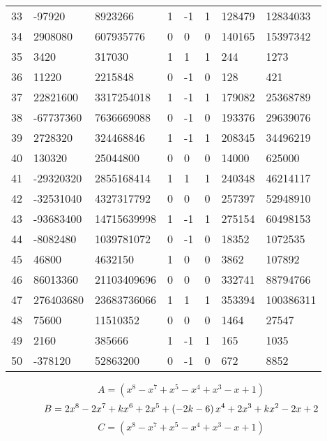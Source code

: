 \documentclass{amsart}
\begin{document}
\begin{longtable}{|l|l|l|lllll|}
33&-97920&8923266&1&-1&1&128479&12834033\\
34&2908080&607935776&0&0&0&140165&15397342\\
35&3420&317030&1&1&1&244&1273\\
36&11220&2215848&0&-1&0&128&421\\
37&22821600&3317254018&1&-1&1&179082&25368789\\
38&-67737360&7636669088&0&-1&0&193376&29639076\\
39&2728320&324468846&1&-1&1&208345&34496219\\
40&130320&25044800&0&0&0&14000&625000\\
41&-29320320&2855168414&1&1&1&240348&46214117\\
42&-32531040&4327317792&0&0&0&257397&52948910\\
43&-93683400&14715639998&1&-1&1&275154&60498153\\
44&-8082480&1039781072&0&-1&0&18352&1072535\\
45&46800&4632150&1&0&0&3862&107892\\
46&86013360&21103409696&0&0&0&332741&88794766\\
47&276403680&23683736066&1&1&1&353394&100386311\\
48&75600&11510352&0&0&0&1464&27547\\
49&2160&385666&1&-1&1&165&1035\\
50&-378120&52863200&0&-1&0&672&8852\\
\hline
\end{longtable}
$$A=(x^8
 - x^7
 + x^5
 - x^4
 + x^3
 - x
 + 1)$$
$$B=2\*x^8
 - 2\*x^7
 + k\*x^6
 + 2\*x^5
 + \left(-2\*k
 - 6\right) \*x^4
 + 2\*x^3
 + k\*x^2
 - 2\*x
 + 2$$
$$C=(x^8
 - x^7
 + x^5
 - x^4
 + x^3
 - x
 + 1)$$
\end{document}
